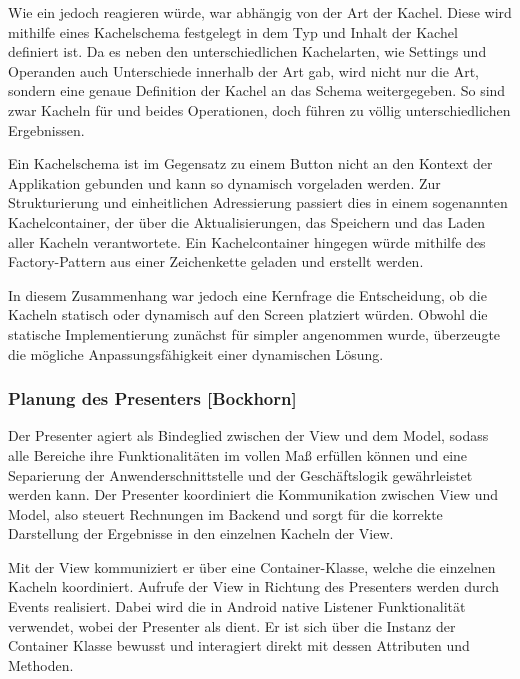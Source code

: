 Wie ein  jedoch reagieren würde, war abhängig von der Art der Kachel. 
Diese wird mithilfe eines Kachelschema festgelegt in dem Typ und Inhalt der Kachel definiert ist. Da es neben den unterschiedlichen Kachelarten, wie Settings und Operanden auch Unterschiede innerhalb der Art gab, wird nicht nur die Art, sondern eine genaue Definition der Kachel an das Schema weitergegeben. So sind zwar Kacheln für  und  beides Operationen, doch führen zu völlig unterschiedlichen Ergebnissen. 

Ein Kachelschema ist im Gegensatz zu einem Button nicht an den Kontext der Applikation gebunden und kann so dynamisch vorgeladen werden. Zur Strukturierung und einheitlichen Adressierung passiert dies in einem sogenannten Kachelcontainer, der über die Aktualisierungen, das Speichern und das Laden aller Kacheln verantwortete. Ein Kachelcontainer hingegen würde mithilfe des Factory-Pattern aus einer Zeichenkette geladen und erstellt werden. 

In diesem Zusammenhang war jedoch eine Kernfrage die Entscheidung, ob die Kacheln statisch oder dynamisch auf den Screen platziert würden. Obwohl die statische Implementierung zunächst für simpler angenommen wurde, überzeugte die mögliche Anpassungsfähigkeit einer dynamischen Lösung.

\clearpage

\subsubsection{Planung des Presenters [Bockhorn]}

Der Presenter agiert als Bindeglied zwischen der View und dem Model, sodass alle Bereiche ihre Funktionalitäten im vollen Maß erfüllen können und eine Separierung der Anwenderschnittstelle und der Geschäftslogik gewährleistet werden kann. Der Presenter koordiniert die Kommunikation zwischen View und Model, also steuert Rechnungen im Backend und sorgt für die korrekte Darstellung der Ergebnisse in den einzelnen Kacheln der View.

Mit der View kommuniziert er über eine Container-Klasse, welche die einzelnen Kacheln koordiniert. Aufrufe der View in Richtung des Presenters werden durch Events realisiert. Dabei wird die in Android native Listener Funktionalität verwendet, wobei der Presenter als  dient. Er ist sich über die Instanz der Container Klasse bewusst und interagiert direkt mit dessen Attributen und Methoden.

